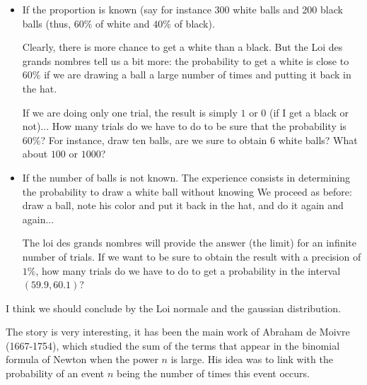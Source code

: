 \begin{itemize}
\item If the proportion is known (say for instance 300 white balls and 200 black balls
(thus, $60\%$ of white and $40\%$ of black).

Clearly, there is more chance to get a white than a black.
But the Loi des grands nombres tell us a bit more: the probability to get a white is close to $60\%$
if we are drawing a ball a large number of times and putting it back in the hat.

If we are doing only one trial, the result is simply $1$ or $0$ (if I get a black or not)...
How many trials do we have to do to be sure that the probability is $60\%$?
For instance, draw ten balls, are we sure to obtain $6$ white balls? What about $100$ or $1000$?
\item If the number of balls is not known.
The experience consists in determining the probability to draw a white ball without knowing 
We proceed as before:
draw a ball, note his color and put it back in the hat, and do it again and again...

The loi des grands nombres will provide the answer (the limit) for an infinite number of trials.
If we want to be sure to obtain the result with a precision of $1\%$,
how many trials do we have to do to get a probability in the interval $(59.9,60.1)$?
\end{itemize}

\medskip

\noindent {}
\bigskip

{\Denis I think we should conclude by the Loi normale and the gaussian distribution. }

The story is very interesting, it has been the main work of Abraham de Moivre (1667-1754), 
which studied the sum of the terms that appear in the binomial formula of Newton when the power $n$ is large.
His idea was to link with the probability of an event $n$ being the number of times this event occurs.

